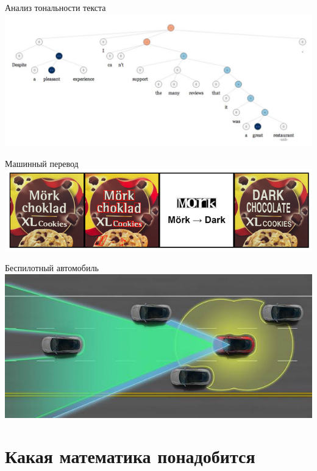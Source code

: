 \documentclass[10pt]{beamer}
\begin{document}
{
\begin{frame}{Анализ тональности текста}
  \centering
  \includegraphics[width=\linewidth, height=\textheight, keepaspectratio]{images/sentiment}\\
\end{frame}
}

{
\begin{frame}{Машинный перевод}
  \centering
  \includegraphics[width=0.9 \linewidth, height=0.9 \textheight, keepaspectratio]{images/translation}\\
\end{frame}
}

{
\begin{frame}{Беспилотный автомобиль}
  \centering
  \includegraphics[width=0.9 \linewidth, height=0.9 \textheight, keepaspectratio]{images/self_driving}\\
\end{frame}
}

\section{Какая математика понадобится}
\end{document}
